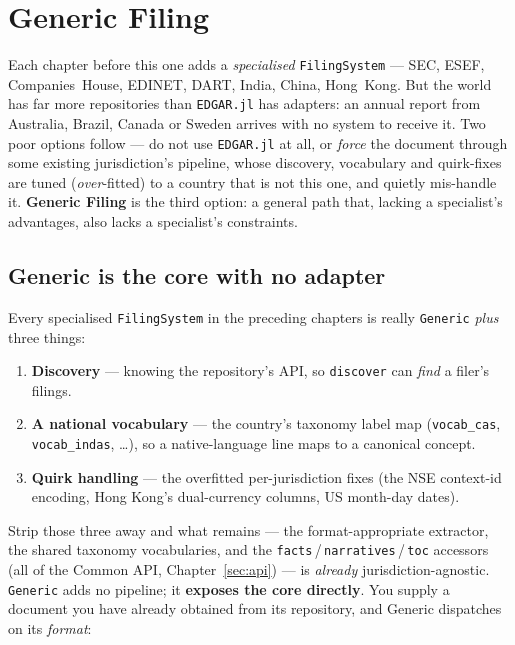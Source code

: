 \documentclass[11pt,a4paper]{report}
\begin{document}
\chapter{Generic Filing}
\label{ch:generic}

Each chapter before this one adds a \emph{specialised} \texttt{FilingSystem} --- SEC, ESEF, Companies~House,
EDINET, DART, India, China, Hong~Kong. But the world has far more repositories than \texttt{EDGAR.jl} has
adapters: an annual report from Australia, Brazil, Canada or Sweden arrives with no system to receive it. Two
poor options follow --- do not use \texttt{EDGAR.jl} at all, or \emph{force} the document through some existing
jurisdiction's pipeline, whose discovery, vocabulary and quirk-fixes are tuned (\emph{over}-fitted) to a
country that is not this one, and quietly mis-handle it. \textbf{Generic Filing} is the third option: a general
path that, lacking a specialist's advantages, also lacks a specialist's constraints.

\section{Generic is the core with no adapter}

Every specialised \texttt{FilingSystem} in the preceding chapters is really \texttt{Generic} \emph{plus} three
things:
\begin{enumerate}[nosep]
  \item \textbf{Discovery} --- knowing the repository's API, so \texttt{discover} can \emph{find} a filer's
    filings.
  \item \textbf{A national vocabulary} --- the country's taxonomy label map (\texttt{vocab\_cas},
    \texttt{vocab\_indas}, \ldots), so a native-language line maps to a canonical concept.
  \item \textbf{Quirk handling} --- the overfitted per-jurisdiction fixes (the NSE context-id encoding, Hong
    Kong's dual-currency columns, US month-day dates).
\end{enumerate}
Strip those three away and what remains --- the format-appropriate extractor, the shared taxonomy
vocabularies, and the \texttt{facts}\,/\,\texttt{narratives}\,/\,\texttt{toc} accessors (all of the Common API,
Chapter~\ref{sec:api}) --- is \emph{already} jurisdiction-agnostic. \texttt{Generic} adds no pipeline; it
\textbf{exposes the core directly}. You supply a document you have already obtained from its repository, and
Generic dispatches on its \emph{format}:
\end{document}
